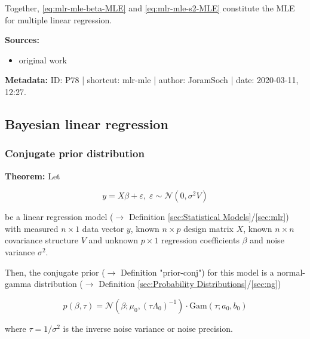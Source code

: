 \documentclass[a4paper,12pt,twoside]{book}
\begin{document}
\vspace{1em}
Together, \eqref{eq:mlr-mle-beta-MLE} and \eqref{eq:mlr-mle-s2-MLE} constitute the MLE for multiple linear regression.


\vspace{1em}
\textbf{Sources:}
\begin{itemize}
\item original work\end{itemize}


\vspace{1em}
\textbf{Metadata:} ID: P78 | shortcut: mlr-mle | author: JoramSoch | date: 2020-03-11, 12:27.
\vspace{1em}



\subsection{Bayesian linear regression}

\subsubsection[\textbf{Conjugate prior distribution}]{Conjugate prior distribution} \label{sec:blr-prior}
\setcounter{equation}{0}

\textbf{Theorem:} Let

\begin{equation} \label{eq:blr-prior-GLM}
y = X \beta + \varepsilon, \; \varepsilon \sim \mathcal{N}(0, \sigma^2 V)
\end{equation}

be a linear regression model ($\rightarrow$ Definition \ref{sec:Statistical Models}/\ref{sec:mlr}) with measured $n \times 1$ data vector $y$, known $n \times p$ design matrix $X$, known $n \times n$ covariance structure $V$ and unknown $p \times 1$ regression coefficients $\beta$ and noise variance $\sigma^2$.

Then, the conjugate prior ($\rightarrow$ Definition "prior-conj") for this model is a normal-gamma distribution ($\rightarrow$ Definition \ref{sec:Probability Distributions}/\ref{sec:ng})

\begin{equation} \label{eq:blr-prior-GLM-NG-prior}
p(\beta,\tau) = \mathcal{N}(\beta; \mu_0, (\tau \Lambda_0)^{-1}) \cdot \mathrm{Gam}(\tau; a_0, b_0)
\end{equation}

where $\tau = 1/\sigma^2$ is the inverse noise variance or noise precision.
\end{document}
